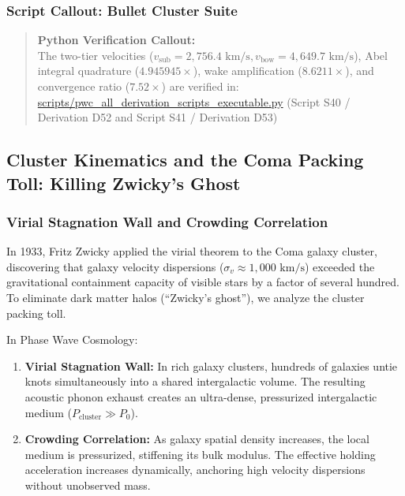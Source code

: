 \documentclass[11pt,a4paper]{article}
\begin{document}
\subsubsection{Script Callout: Bullet Cluster Suite}
\label{subsubsec:callout_bullet}

\begin{quote}
\textbf{Python Verification Callout:}\\
The two-tier velocities ($v_{\text{sub}} = 2,756.4\text{ km/s}, v_{\text{bow}} = 4,649.7\text{ km/s}$), Abel integral quadrature ($4.945945\times$), wake amplification ($8.6211\times$), and convergence ratio ($7.52\times$) are verified in:\\
\url{scripts/pwc_all_derivation_scripts_executable.py} (Script S40 / Derivation D52 and Script S41 / Derivation D53)
\end{quote}

\subsection{Cluster Kinematics and the Coma Packing Toll: Killing Zwicky's Ghost}
\label{subsec:coma_cluster}

\subsubsection{Virial Stagnation Wall and Crowding Correlation}
\label{subsubsec:coma_virial}

In 1933, Fritz Zwicky applied the virial theorem to the Coma galaxy cluster, discovering that galaxy velocity dispersions ($\sigma_v \approx 1,000\text{ km/s}$) exceeded the gravitational containment capacity of visible stars by a factor of several hundred. To eliminate dark matter halos (``Zwicky's ghost''), we analyze the cluster packing toll.

In Phase Wave Cosmology:
\begin{enumerate}
    \item \textbf{Virial Stagnation Wall:} In rich galaxy clusters, hundreds of galaxies untie knots simultaneously into a shared intergalactic volume. The resulting acoustic phonon exhaust creates an ultra-dense, pressurized intergalactic medium ($P_{\text{cluster}} \gg P_0$).
    \item \textbf{Crowding Correlation:} As galaxy spatial density increases, the local medium is pressurized, stiffening its bulk modulus. The effective holding acceleration increases dynamically, anchoring high velocity dispersions without unobserved mass.
\end{enumerate}
\end{document}
